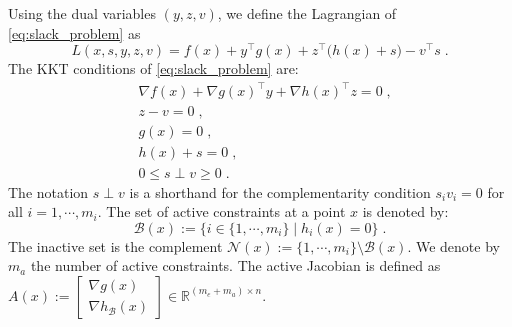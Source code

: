 Using the dual variables $(y, z, v)$, we define the Lagrangian of \eqref{eq:slack_problem} as
\begin{equation}
  \label{eq:lagrangian}
  L(x, s, y, z, v) = f(x) + y^\top g(x) + z^\top \big(h(x) +s\big)
  - v^\top s \; .
\end{equation}
The KKT conditions of \eqref{eq:slack_problem} are:
\begin{subequations}
  \label{eq:kktconditions}
    \begin{align}
      & \nabla f(x) + \nabla g(x)^\top y + \nabla h(x)^\top z  = 0 \; , \\
      & z - v = 0 \; , \\
      & g(x) = 0 \; , \\
      & h(x) + s = 0 \; , \\
      \label{eq:kktconditions:comps}
      & 0 \leq s \perp v \geq 0 \; .
    \end{align}
\end{subequations}
The notation $s \perp v$ is a shorthand for the complementarity
condition $s_i v_i = 0$ for all $i=1,\cdots, m_i$.
The set of active constraints at a point $x$ is denoted by:
\begin{equation}
  \mathcal{B}(x) := \{ i \in\{ 1, \cdots, m_i\} \; | \; h_i(x) = 0 \} \; .
\end{equation}
The inactive set is the complement $\mathcal{N}(x) := \{1, \cdots, m_i \} \setminus \mathcal{B}(x)$.
We denote by $m_a$ the number of active constraints.
The active Jacobian is defined as $A(x) := \begin{bmatrix} \nabla g(x) \\ \nabla h_{\mathcal{B}}(x) \end{bmatrix} \in \mathbb{R}^{(m_e + m_a) \times n}$.


